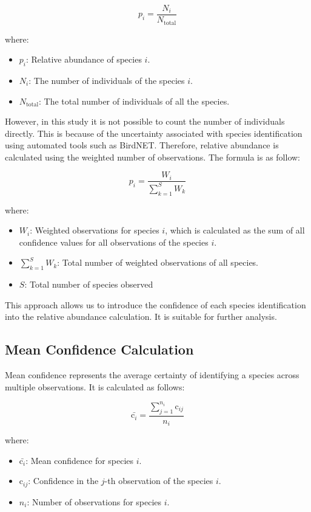 \documentclass[a4paper,12pt]{article}
\begin{document}
\[
p_i = \frac{N_i}{N_{\text{total}}}
\]

where:
\begin{itemize}
    \item $p_i$: Relative abundance of species $i$.
    \item $N_i$: The number of individuals of the species $i$.
    \item $N_{\text{total}}$: The total number of individuals of all the species.
\end{itemize}

However, in this study it is not possible to count the number of individuals directly. This is because of the uncertainty associated with species identification using automated tools such as BirdNET. Therefore, relative abundance is calculated using the weighted number of observations. The formula is as follow:

\[
p_i = \frac{W_i}{\sum_{k=1}^{S} W_k}
\]

where:
\begin{itemize}
    \item $W_i$: Weighted observations for species $i$, which is calculated as the sum of all confidence values for all observations of the species $i$.
    \item $\sum_{k=1}^{S} W_k$: Total number of weighted observations of all species.
    \item $S$: Total number of species observed
\end{itemize}

This approach allows us to introduce the confidence of each species identification into the relative abundance calculation. It is suitable for further analysis.

\subsection{Mean Confidence Calculation}
Mean confidence represents the average certainty of identifying a species across multiple observations. It is calculated as follows:

\[
\bar{\text{c}_i} = \frac{\sum_{j=1}^{n_i} 
\text{c}_{ij}}{n_i}
\]

where:
\begin{itemize}
    \item $\bar{\text{c}_i}$: Mean confidence for species $i$.
    \item $\text{c}_{ij}$: Confidence in the $j$-th observation of the species $i$.
    \item $n_i$: Number of observations for species $i$.
\end{itemize}
\end{document}
